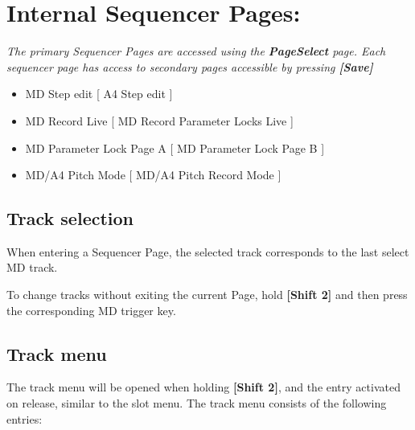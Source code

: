 \chapter{Internal Sequencer Pages:}

\textit{The primary Sequencer Pages are accessed using the \textbf{PageSelect} page. Each sequencer page has access to secondary pages accessible by pressing \textbf{[Save]}}
\begin{itemize}
	\item MD Step edit                          [ A4 Step edit ]
	\item MD Record Live                      [ MD Record Parameter Locks Live ]
	\item MD Parameter Lock Page A  [ MD Parameter Lock Page B ]
	\item MD/A4 Pitch Mode                [ MD/A4 Pitch Record Mode ]
\end{itemize}
\section{Track selection}
When entering a Sequencer Page, the selected track corresponds to the last select MD track.

To change tracks without exiting the current Page, hold \textbf{[Shift 2]}
and then press the corresponding MD trigger key.

\section{Track menu}

\vspace{-10pt}


The track menu will be opened when holding \textbf{[Shift 2]}, and the entry activated on release, similar to the slot menu.
The track menu consists of the following entries:

